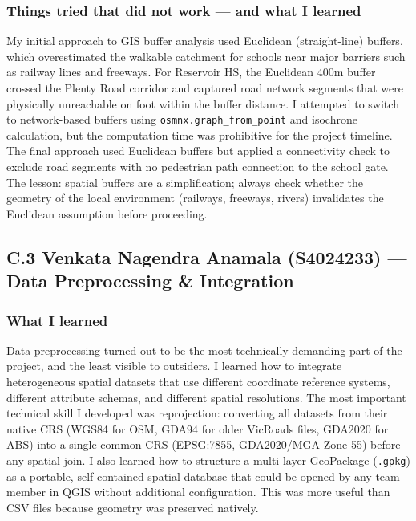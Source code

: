 \documentclass[11pt,a4paper]{article}
\begin{document}
\subsubsection*{Things tried that did not work — and what I learned}
My initial approach to GIS buffer analysis used Euclidean (straight-line) buffers, which overestimated the walkable catchment for schools near major barriers such as railway lines and freeways. For Reservoir HS, the Euclidean 400m buffer crossed the Plenty Road corridor and captured road network segments that were physically unreachable on foot within the buffer distance. I attempted to switch to network-based buffers using \texttt{osmnx.graph\_from\_point} and isochrone calculation, but the computation time was prohibitive for the project timeline. The final approach used Euclidean buffers but applied a connectivity check to exclude road segments with no pedestrian path connection to the school gate. The lesson: spatial buffers are a simplification; always check whether the geometry of the local environment (railways, freeways, rivers) invalidates the Euclidean assumption before proceeding.

\bigskip
\subsection*{C.3 Venkata Nagendra Anamala (S4024233) — Data Preprocessing \& Integration}

\subsubsection*{What I learned}
Data preprocessing turned out to be the most technically demanding part of the project, and the least visible to outsiders. I learned how to integrate heterogeneous spatial datasets that use different coordinate reference systems, different attribute schemas, and different spatial resolutions. The most important technical skill I developed was reprojection: converting all datasets from their native CRS (WGS84 for OSM, GDA94 for older VicRoads files, GDA2020 for ABS) into a single common CRS (EPSG:7855, GDA2020/MGA Zone 55) before any spatial join. I also learned how to structure a multi-layer GeoPackage (\texttt{.gpkg}) as a portable, self-contained spatial database that could be opened by any team member in QGIS without additional configuration. This was more useful than CSV files because geometry was preserved natively.
\end{document}
